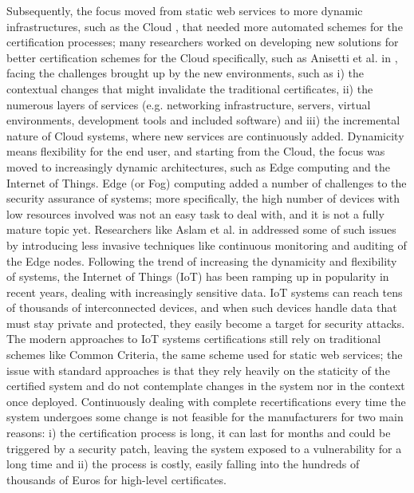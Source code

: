 Subsequently, the focus moved from static web services to more dynamic infrastructures, such as the Cloud \cite{mell2011nist}, that needed more automated schemes for the certification processes; many researchers worked on developing new solutions for better certification schemes for the Cloud specifically, such as Anisetti et al. in \cite{anisetti2017semi}, facing the challenges brought up by the new environments, such as i) the contextual changes that might invalidate the traditional certificates, ii) the numerous layers of services (e.g. networking infrastructure, servers, virtual environments, development tools and included software) and iii) the incremental nature of Cloud systems, where new services are continuously added. Dynamicity means flexibility for the end user, and starting from the Cloud, the focus was moved to increasingly dynamic architectures, such as Edge computing and the Internet of Things. Edge (or Fog) computing added a number of challenges to the security assurance of systems; more specifically, the high number of devices with low resources involved was not an easy task to deal with, and it is not a fully mature topic yet. Researchers like Aslam et al. in \cite{aslam2020fonac} addressed some of such issues by introducing less invasive techniques like continuous monitoring and auditing of the Edge nodes. Following the trend of increasing the dynamicity and flexibility of systems, the Internet of Things (IoT) has been ramping up in popularity in recent years, dealing with increasingly sensitive data. IoT systems can reach tens of thousands of interconnected devices, and when such devices handle data that must stay private and protected, they easily become a target for security attacks. The modern approaches to IoT systems certifications still rely on traditional schemes like Common Criteria, the same scheme used for static web services; the issue with standard approaches is that they rely heavily on the staticity of the certified system and do not contemplate changes in the system nor in the context once deployed. Continuously dealing with complete recertifications every time the system undergoes some change is not feasible for the manufacturers for two main reasons: i) the certification process is long, it can last for months and could be triggered by a security patch, leaving the system exposed to a vulnerability for a long time and ii) the process is costly, easily falling into the hundreds of thousands of Euros for high-level certificates. 

